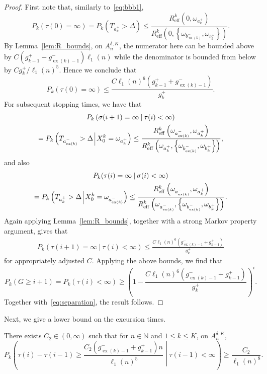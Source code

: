 \documentclass[AHL,Unicode,longabstracts,published]{cedram}
\newcommand{\N}{\mathbb N}
\newcommand{\eff}{\mathrm{eff}}
\newcommand{\relmiddle}[1]{\mathrel{}\middle#1\mathrel{}}
\newcommand{\cond}{\relmiddle{|}}
\newcommand{\Pk}{{P_k}}
\newcommand\ex{\operatorname{ex}}
\newcommand{\aat}[1]{a_{\ex(#1)}^-}
\newcommand{\bt}[1]{b_{\ex(#1)}^-}
\newcommand{\gtt}[1]{g_{\ex(#1)-1}^-}
\begin{document}
\begin{proof}
First note that, similarly to~\eqref{eq:bbb1},
\[
\Pk(\tau(0)=\infty)=\Pk\left(T_{a_k^+}>\Delta\right)\leq
\frac{{R}^k_\eff\left(0,\omega_{a_k^+}\right)}{{R}^k_\eff\left(0,\left\{\omega_{\bt{k}},\omega_{{b}_k^+}\right\}\right)}.
\]
By Lemma~\ref{lem:R_bounds}, on $A_n^{\delta,K}$, the numerator here can be bounded above by $C(g_{k-1}^++\gtt{k})\ell_1(n)$ while the denominator is bounded from below by $Cg_k^+/\ell_1(n)^5$. Hence we conclude that
\begin{equation}\label{taubound}
\Pk(\tau(0)=\infty)\leq \frac{C\ell_1(n)^6\left(g_{k-1}^++\gtt{k}\right)}{g_{k}^+}.
\end{equation}
For subsequent stopping times, we have that
\begin{multline*}
\Pk\left(\sigma(i+1)=\infty\:\middle|\:\tau(i)<\infty\right)\\
=\Pk\left(T_{\aat{k}}>\Delta\:\vline\:X^k_0=\omega_{a_k^+}\right)\leq\frac{{R}^k_\eff\left(\omega_{\aat{k}},\omega_{a_k^+}\right)}{{R}^k_\eff\left(\omega_{a_k^+},
\left\{\omega_{\bt{k}},\omega_{{b}_k^+}\right\}\right)},
\end{multline*}
and also
\begin{multline*}
\Pk(\tau(i)=\infty\:|\:\sigma(i)<\infty)\\
=\Pk
\left(T_{{a}_k^+}>\Delta\:\vline\:X^k_0=\omega_{\aat{k}}\right)\leq
\frac{{R}^k_\eff\left(\omega_{\aat{k}},\omega_{a_k^+}\right)}{{R}^k_\eff\left(\omega_{\aat{k}},
\left\{\omega_{\bt{k}},\omega_{{b}_k^+}\right\}\right)}.
\end{multline*}
Again applying Lemma~\ref{lem:R_bounds}, together with a strong Markov property argument, gives that
\[
\begin{split}
\Pk(\tau(i+1)=\infty\:|\:\tau(i)<\infty)\leq \frac{C\ell_1(n)^6\left(\gtt{k}+g_{k-1}^+\right)}{{g_{k}^+}}
\end{split}
\]
for appropriately adjusted $C$. Applying the above bounds, we find that
\[
\Pk\left(G\geq i+1\right)=\Pk\left(\tau(i)<\infty\right)\geq \left(1- \frac{C\ell_1(n)^6\left(\gtt{k}+g_{k-1}^+\right)}{{g_{k}^+}}\right)^i.
\]
Together with~\eqref{eq:separation}, the result follows.
\end{proof}

Next, we give a lower bound on the excursion times.

\begin{lemm}\label{lem:exc}
There exists $C_2\in (0,\infty)$ such that for $n\in\N$ and $1\leq k\leq K$, on $A_n^{\delta,K}$,
\[
\Pk\left(\tau(i)-\tau(i-1)\geq \frac{C_2\left(\gtt{k}+g_{k-1}^+\right)n}{ \ell_1(n)^{5}}\cond\tau(i-1)<\infty\right)\geq \frac{C_2}{\ell_1(n)^{8}}.
\]
\end{lemm}
\end{document}
